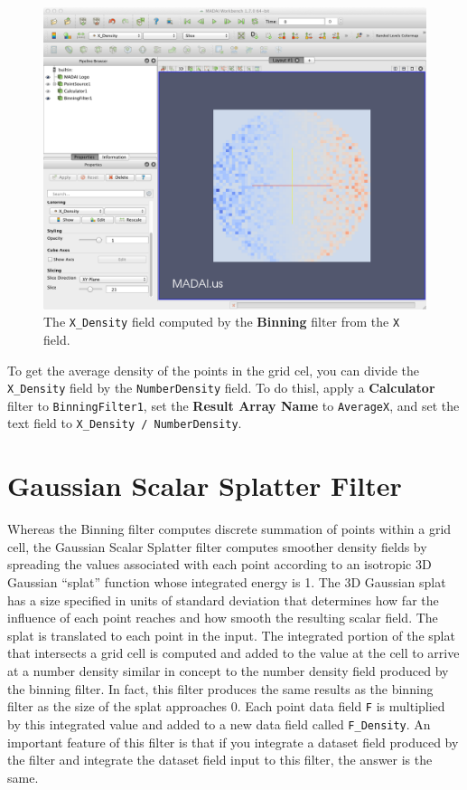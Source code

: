 \documentclass[12pt]{article}
\begin{document}
\begin{figure}[htbp]
   \centering
   \includegraphics[scale=.25]{images/BinningFilter_XDensity.png} %
   \caption{The \texttt{X\_Density} field computed by the \textbf{Binning} filter from the \texttt{X} field.}
   \label{fig:BinningFilterXDensity}
\end{figure}

To get the average density of the points in the grid cel, you can divide the \texttt{X\_Density} field by the \texttt{NumberDensity} field. To do thisl, apply a \textbf{Calculator} filter to \texttt{BinningFilter1}, set the \textbf{Result Array Name} to \texttt{AverageX}, and set the text field to \texttt{X\_Density / NumberDensity}. 

\section{Gaussian Scalar Splatter Filter}

Whereas the Binning filter computes discrete summation of points within a grid cell, the Gaussian Scalar Splatter filter computes smoother density fields by spreading the values associated with each point according to an isotropic 3D Gaussian ``splat'' function whose integrated energy is 1. The 3D Gaussian splat has a size specified in units of standard deviation that determines how far the influence of each point reaches and how smooth the resulting scalar field. The splat is translated to each point in the input. The integrated portion of the splat that intersects a grid cell is computed and added to the value at the cell to arrive at a number density similar in concept to the number density field produced by the binning filter. In fact, this filter produces the same results as the binning filter as the size of the splat approaches 0. Each point data field \texttt{F} is multiplied by this integrated value and added to a new data field called \texttt{F\_Density}. An important feature of this filter is that if you integrate a dataset field produced by the filter and integrate the dataset field input to this filter, the answer is the same.
\end{document}
